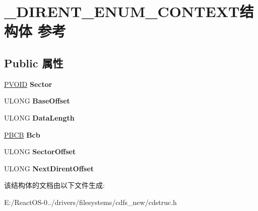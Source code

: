 \hypertarget{struct___d_i_r_e_n_t___e_n_u_m___c_o_n_t_e_x_t}{}\section{\+\_\+\+D\+I\+R\+E\+N\+T\+\_\+\+E\+N\+U\+M\+\_\+\+C\+O\+N\+T\+E\+X\+T结构体 参考}
\label{struct___d_i_r_e_n_t___e_n_u_m___c_o_n_t_e_x_t}
\subsection*{Public 属性}
\begin{DoxyCompactItemize}
\item 
\mbox{\label{struct___d_i_r_e_n_t___e_n_u_m___c_o_n_t_e_x_t_a30e71c1f646f7a1c4cb4176e86af4af2}} 
\hyperlink{interfacevoid}{P\+V\+O\+ID} {\bfseries Sector}
\item 
\mbox{\label{struct___d_i_r_e_n_t___e_n_u_m___c_o_n_t_e_x_t_a411ea9d223be6fb69363a41be56c3a33}} 
U\+L\+O\+NG {\bfseries Base\+Offset}
\item 
\mbox{\label{struct___d_i_r_e_n_t___e_n_u_m___c_o_n_t_e_x_t_a2e502991288dcca61bf99cf442d14488}} 
U\+L\+O\+NG {\bfseries Data\+Length}
\item 
\mbox{\label{struct___d_i_r_e_n_t___e_n_u_m___c_o_n_t_e_x_t_a67dd809d39e15b77786c09a2221d5d20}} 
\hyperlink{interfacevoid}{P\+B\+CB} {\bfseries Bcb}
\item 
\mbox{\label{struct___d_i_r_e_n_t___e_n_u_m___c_o_n_t_e_x_t_a7ca9eb6ce247ad7c255b9f620117f37f}} 
U\+L\+O\+NG {\bfseries Sector\+Offset}
\item 
\mbox{\label{struct___d_i_r_e_n_t___e_n_u_m___c_o_n_t_e_x_t_adf050bcbbe775095e62ef0174bf201b0}} 
U\+L\+O\+NG {\bfseries Next\+Dirent\+Offset}
\end{DoxyCompactItemize}


该结构体的文档由以下文件生成\+:\begin{DoxyCompactItemize}
\item 
E\+:/\+React\+O\+S-\/0../drivers/filesystems/cdfs\+\_\+new/cdstruc.\+h\end{DoxyCompactItemize}
